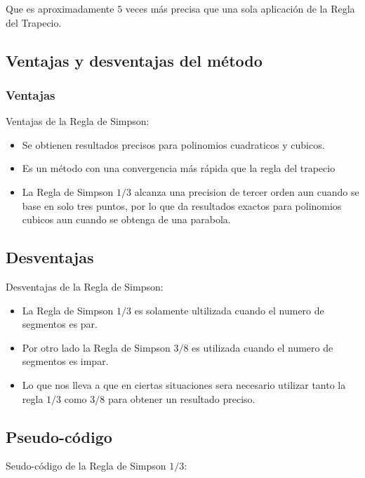 \documentclass[journal,transmag]{IEEEtran}
\theoremstyle{mytheoremstyle}
\theoremstyle{mytheoremstyle}
\theoremstyle{myproblemstyle}
\begin{document}
        Que es aproximadamente $5$ veces más precisa que una sola aplicación de la Regla del Trapecio. 
        
    \subsection{Ventajas y desventajas del método}
        \subsubsection{Ventajas}
            \begin{center}
            Ventajas de la Regla de Simpson:
            \end{center}
            \begin{itemize}
                \item   Se obtienen resultados precisos para polinomios cuadraticos y cubicos.
                \item   Es un método con una convergencia más rápida que la regla del trapecio
                \item   La Regla de Simpson $1/3$ alcanza una precision de tercer orden aun cuando se base
                en solo tres puntos, por lo que da resultados exactos para polinomios cubicos aun cuando se obtenga
                de una parabola.
      
            \end{itemize}
        \subsection{Desventajas}
            \begin{center}
            Desventajas de la Regla de Simpson:
            \end{center}
            \begin{itemize}
                \item  La Regla de Simpson $1/3$ es solamente ultilizada cuando el numero de segmentos es par. 
                \item  Por otro lado la Regla de Simpson $3/8$ es utilizada cuando el numero de segmentos es impar. 
                \item  Lo que nos lleva a que en ciertas situaciones sera necesario utilizar tanto la regla $1/3$ como $3/8$
                para obtener un resultado preciso. 
                
            \end{itemize}
    \subsection{Pseudo-código}
        Seudo-código de la Regla de Simpson $1/3$: \\
\end{document}
